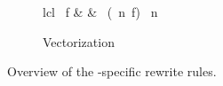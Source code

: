 \begin{figure}[t]
\vspace{\ruleSpace}
\begin{subfigure}[b]{1\linewidth}
  \begin{mdframed}
    \vspace{-\bigskipamount}
    \begin{rerule*}{lcl}
      \map\ f
        & \rightarrow &
          \asScalar
            \circ \map\ (\vect\ n\ f)
            \circ \asVector\ n
    \end{rerule*}
  \end{mdframed}
  \vspace{-1em}
  \caption{Vectorization}
  \label{fig:low:vect}
\end{subfigure}

\caption{Overview of the \OpenCL-specific rewrite rules.}
\label{fig:lowRules}
\end{figure}

\FloatBarrier


%
%

